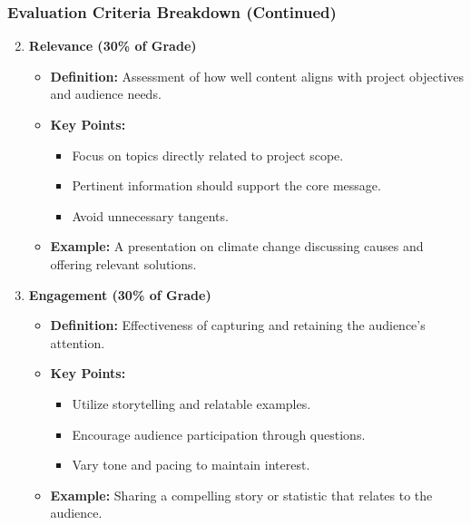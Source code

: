 \documentclass[aspectratio=169]{beamer}
\begin{document}
\begin{frame}[fragile]
    \frametitle{Evaluation Criteria Breakdown (Continued)}
    \begin{enumerate}
        \setcounter{enumi}{1}
        \item \textbf{Relevance (30\% of Grade)}
        \begin{itemize}
            \item \textbf{Definition:} Assessment of how well content aligns with project objectives and audience needs.
            \item \textbf{Key Points:}
            \begin{itemize}
                \item Focus on topics directly related to project scope.
                \item Pertinent information should support the core message.
                \item Avoid unnecessary tangents.
            \end{itemize}
            \item \textbf{Example:} A presentation on climate change discussing causes and offering relevant solutions.
        \end{itemize}
        
        \item \textbf{Engagement (30\% of Grade)}
        \begin{itemize}
            \item \textbf{Definition:} Effectiveness of capturing and retaining the audience's attention.
            \item \textbf{Key Points:}
            \begin{itemize}
                \item Utilize storytelling and relatable examples.
                \item Encourage audience participation through questions.
                \item Vary tone and pacing to maintain interest.
            \end{itemize}
            \item \textbf{Example:} Sharing a compelling story or statistic that relates to the audience.
        \end{itemize}
    \end{enumerate}
\end{frame}
\end{document}
